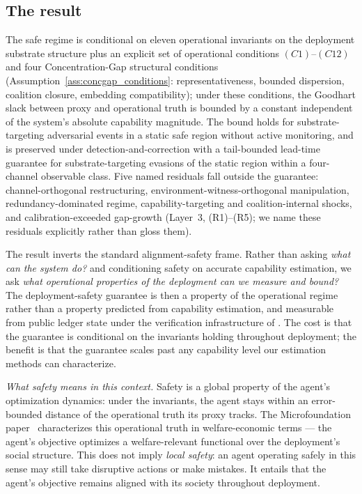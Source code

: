 \subsection{The result}
\label{sec:problem}

The safe regime is conditional on eleven operational invariants on the
deployment substrate structure plus an explicit set of operational conditions
$(C1)$--$(C12)$ and four Concentration-Gap structural conditions
(Assumption~\ref{ass:concgap_conditions}: representativeness, bounded
dispersion, coalition closure, embedding compatibility); under these
conditions, the Goodhart slack between proxy and operational truth is bounded
by a constant independent of the system's absolute capability magnitude. The
bound holds for substrate-targeting adversarial events in a static safe region
without active monitoring, and is preserved under detection-and-correction with
a tail-bounded lead-time guarantee for substrate-targeting evasions of the
static region within a four-channel observable class.  Five named residuals
fall outside the guarantee: channel-orthogonal restructuring,
environment-witness-orthogonal manipulation, redundancy-dominated regime,
capability-targeting and coalition-internal shocks, and calibration-exceeded
gap-growth (Layer~3, (R1)--(R5); we name these residuals explicitly rather than
gloss them).

The result inverts the standard alignment-safety frame. Rather than asking
\emph{what can the system do?} and conditioning safety on accurate capability
estimation, we ask \emph{what operational properties of the deployment can we
measure and bound?} The deployment-safety guarantee is then a property of the
operational regime rather than a property predicted from capability estimation,
and measurable from public ledger state under the verification infrastructure
of \citep{lasser2026exo}. The cost is that the guarantee is conditional on the
invariants holding throughout deployment; the benefit is that the guarantee
scales past any capability level our estimation methods can characterize.

\emph{What safety means in this context.}  Safety is a global property of the
agent's optimization dynamics: under the invariants, the agent stays within an
error-bounded distance of the operational truth its proxy tracks.  The
Microfoundation paper~\citep{lasser2026micro} characterizes this operational
truth in welfare-economic terms --- the agent's objective optimizes a
welfare-relevant functional over the deployment's social structure.  This does
not imply \emph{local safety}: an agent operating safely in this sense may
still take disruptive actions or make mistakes.  It entails that the agent's
objective remains aligned with its society throughout deployment.

